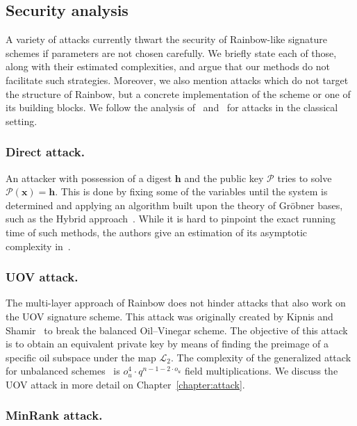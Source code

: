\documentclass[12pt, a4paper, oneside]{memoir}
\theoremstyle{definition}
\begin{document}
\subsection{Security analysis}\label{subsec:analysis}

A variety of attacks currently thwart the security of Rainbow-like signature schemes if parameters are not chosen carefully. We briefly state each of those, along with their estimated complexities, and argue that our methods do not facilitate such strategies. Moreover, we also mention attacks which do not target the structure of Rainbow, but a concrete implementation of the scheme or one of its building blocks. We follow the analysis of~\cite[Section 8]{Ding:201901} and~\cite{Petzoldt:201005} for attacks in the classical setting.

\subsubsection{Direct attack.} 

An attacker with possession of a digest $\mathbf{h}$ and the public key $\mathcal{P}$ tries to solve $\mathcal{P}(\mathbf{x}) = \mathbf{h}$. This is done by fixing some of the variables until the system is determined and applying an algorithm built upon the theory of Gröbner bases, such as the Hybrid approach~\cite{Bettale:201207}. While it is hard to pinpoint the exact running time of such methods, the authors give an estimation of its asymptotic complexity in~\cite[Eq.~5]{Bettale:201207}.

\subsubsection{UOV attack.} 

The multi-layer approach of Rainbow does not hinder attacks that also work on the UOV signature scheme. This attack was originally created by Kipnis and Shamir~\cite{Kipnis:199808} to break the balanced Oil--Vinegar scheme. The objective of this attack is to obtain an equivalent private key by means of finding the preimage of a specific oil subspace under the map $\mathcal{L}_{2}$. The complexity of the generalized attack for unbalanced schemes~\cite{Kipnis:199904} is $o_{u}^{4} \cdot q^{n - 1 - 2 \cdot o_{u}}$ field multiplications. We discuss the UOV attack in more detail on Chapter~\ref{chapter:attack}.

\subsubsection{MinRank attack.} 
\end{document}
